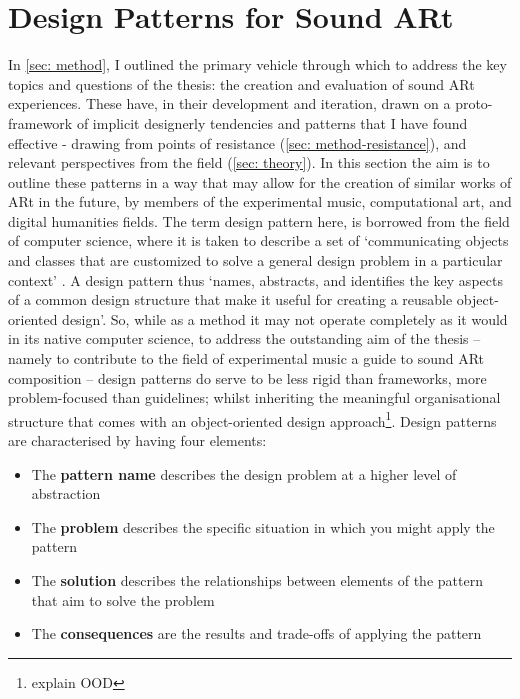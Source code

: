 \section{Design Patterns for Sound ARt} \label{sec: discussion-patterns}
In \autoref{sec: method}, I outlined the primary vehicle through which to address the key topics and questions of the thesis: the creation and evaluation of sound ARt experiences. These have, in their development and iteration, drawn on a proto-framework of implicit designerly tendencies and patterns that I have found effective - drawing from points of resistance (\autoref{sec: method-resistance}), and relevant perspectives from the field (\autoref{sec: theory}). In this section the aim is to outline these patterns in a way that may allow for the creation of similar works of ARt in the future, by members of the experimental music, computational art, and digital humanities fields. The term design pattern here, is borrowed from the field of computer science, where it is taken to describe a set of `communicating objects and classes that are customized to solve a general design problem in a particular context' \citep{gamma1995}. A design pattern thus `names, abstracts, and identifies the key aspects of a common design structure that make it useful for creating a reusable object-oriented design'. So, while as a method it may not operate completely as it would in its native computer science, to address the outstanding aim of the thesis -- namely to contribute to the field of experimental music a guide to sound ARt composition -- design patterns do serve to be less rigid than frameworks, more problem-focused than guidelines; whilst inheriting the meaningful organisational structure that comes with an object-oriented design approach\footnote{explain OOD}. Design patterns are characterised by having four elements:
\begin{itemize}
    \item The \textbf{pattern name} describes the design problem at a higher level of abstraction
    \item The \textbf{problem} describes the specific situation in which you might apply the pattern
    \item The \textbf{solution} describes the relationships between elements of the pattern that aim to solve the problem
    \item The \textbf{consequences} are the results and trade-offs of applying the pattern
\end{itemize}


